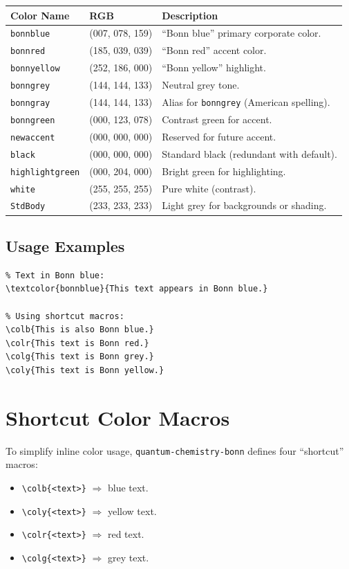 \documentclass[a4paper,12pt]{article}
\begin{document}
\bigskip
\begin{tabular}{@{}llp{6.5cm}@{}}
\textbf{Color Name}     & \textbf{RGB}        & \textbf{Description} \\
\midrule
\texttt{bonnblue}       & (007, 078, 159)        & “Bonn blue” primary corporate color. \\
\texttt{bonnred}        & (185, 039, 039)       & “Bonn red” accent color. \\
\texttt{bonnyellow}     & (252, 186, 000)       & “Bonn yellow” highlight. \\
\texttt{bonngrey}       & (144, 144, 133)     & Neutral grey tone. \\
\texttt{bonngray}       & (144, 144, 133)     & Alias for \texttt{bonngrey} (American spelling). \\
\texttt{bonngreen}      & (000, 123, 078)        & Contrast green for accent. \\
\midrule
\texttt{newaccent}      & (000, 000, 000)           & Reserved for future accent. \\
\texttt{black}          & (000, 000, 000)           & Standard black (redundant with default). \\
\texttt{highlightgreen} & (000, 204, 000)         & Bright green for highlighting. \\
\texttt{white}          & (255, 255, 255)     & Pure white (contrast). \\
\texttt{StdBody}        & (233, 233, 233)     & Light grey for backgrounds or shading. \\
\end{tabular}

\bigskip
\subsection{Usage Examples}
\begin{verbatim}
% Text in Bonn blue:
\textcolor{bonnblue}{This text appears in Bonn blue.}

% Using shortcut macros:
\colb{This is also Bonn blue.}
\colr{This text is Bonn red.}
\colg{This text is Bonn grey.}
\coly{This text is Bonn yellow.}
\end{verbatim}

\section{Shortcut Color Macros}
\label{sec:shortcuts}
To simplify inline color usage, \texttt{quantum-chemistry-bonn} defines four “shortcut” macros:
\begin{itemize}
  \item \verb|\colb{<text>}|  $\Rightarrow$ \textcolor{bonnblue}{blue} text.
  \item \verb|\coly{<text>}|  $\Rightarrow$ \textcolor{bonnyellow}{yellow} text.
  \item \verb|\colr{<text>}|  $\Rightarrow$ \textcolor{bonnred}{red} text.
  \item \verb|\colg{<text>}|  $\Rightarrow$ \textcolor{bonngrey}{grey} text.
\end{itemize}
\end{document}
